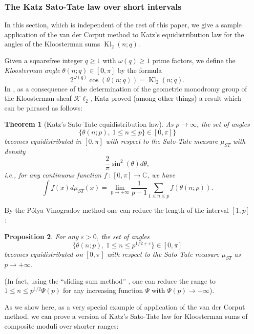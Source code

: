 \documentclass[12pt,a4paper,reqno]{amsart}
\numberwithin{equation}{section}
\DeclareMathOperator{\hypk}{Kl}
\newcommand{\Kl}{\mathcal{K}\ell}
\theoremstyle{plain}
\newtheorem{theorem}{Theorem}[section]
\newtheorem{proposition}[theorem]{Proposition}
\theoremstyle{definition}
\newcommand\eps{\varepsilon}
\newcommand\ov{\overline}
\newcommand\Cc{\mathbb{C}}
\newcommand{\ra}{\rightarrow}
\begin{document}
\subsubsection{The Katz Sato-Tate law over short intervals}

In this section, which is independent of the rest of this paper, we
give a sample application of the van der Corput method to Katz's
equidistribution law for the angles of the Kloosterman sums
$\hypk_2(n;q)$.  
\par
Given a squarefree integer $q\geq 1$ with $\omega(q)\geq 1$ prime
factors, we define the \emph{Kloosterman angle}
$\theta(n;q)\in[0,\pi]$ by the formula
$$
2^{\omega(q)}\cos(\theta(n;q))=\hypk_2(n;q).
$$
In \cite{GKM}, as a consequence of the determination of the geometric
monodromy group of the Kloosterman sheaf $\Kl_2$, Katz proved (among
other things) a result which can be phrased as follows:

\begin{theorem}[Katz's Sato-Tate equidistribution law] 
  As $p\ra\infty$, the set of angles
$$
\{\theta(n;p),\ 1\leq n\leq p\}\in [0,\pi]\}
$$ 
becomes equidistributed in $[0,\pi]$ with respect to the Sato-Tate
measure $\mu_{ST}$ with density
$$
\frac{2}{\pi}\sin^2(\theta)d\theta,
$$
i.e., for any continuous function $f\,:\, [0,\pi]\ra \Cc$, we have
$$
\int f(x)d\mu_{ST}(x)=\lim_{p\ra +\infty}
\frac{1}{p-1}\sum_{1\leq n\leq p}f(\theta(n;p)).
$$
\end{theorem}

By the P\'olya-Vinogradov method one can reduce the length of the
interval $[1,p]$:
\begin{proposition} 
  For any $\eps>0$, the set of angles
$$
\{\theta(n;p),\ 1\leq n\leq p^{1/2+\eps}\}\in [0,\pi]
$$ 
becomes equidistributed on $[0,\pi]$ with respect to the Sato-Tate
measure $\mu_{ST}$ as $p\ra +\infty$.
\end{proposition}

(In fact, using the ``sliding sum method'' \cite{sliding}, one can
reduce the range to $1\leq n\leq p^{1/2}\Psi(p)$ for any increasing function
$\Psi$ with $\Psi(p)\ra +\infty$).

As we show here, as a very special example of application of the van
der Corput method, we can prove a version of Katz's Sato-Tate law for
Kloosterman sums of composite moduli over shorter ranges:
\end{document}
